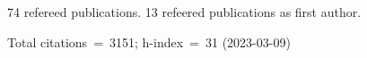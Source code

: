 74 refereed publications. 13 refeered publications as first author.

Total citations~=~3151; h-index~=~31 (2023-03-09)